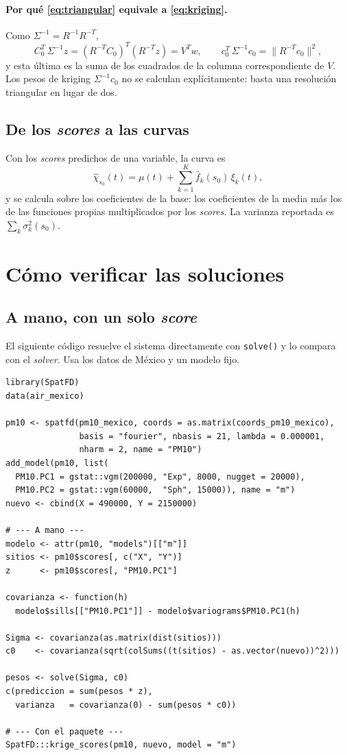 \documentclass[11pt,a4paper]{article}
\newcommand{\code}[1]{\texttt{#1}}
\begin{document}
\paragraph{Por qué \eqref{eq:triangular} equivale a \eqref{eq:kriging}.}
Como $\Sigma^{-1} = R^{-1} R^{-T}$,
\[
  C_0^{T}\,\Sigma^{-1} z = (R^{-T} C_0)^{T} (R^{-T} z) = V^{T} w,
  \qquad
  c_{0}^{T}\,\Sigma^{-1} c_{0} = \lVert R^{-T} c_{0} \rVert^2 ,
\]
y esta última es la suma de los cuadrados de la columna correspondiente de
$V$. Los pesos de kriging $\Sigma^{-1} c_0$ no se calculan explícitamente:
basta una resolución triangular en lugar de dos.

\subsection{De los \emph{scores} a las curvas}

Con los \emph{scores} predichos de una variable, la curva es
\[
  \hat\chi_{s_0}(t) = \mu(t) + \sum_{k=1}^{K} \hat f_k(s_0)\,\xi_k(t),
\]
y se calcula sobre los coeficientes de la base: los coeficientes de la media
más los de las funciones propias multiplicados por los \emph{scores}. La
varianza reportada es $\sum_k \sigma_k^2(s_0)$.

\section{Cómo verificar las soluciones}

\subsection{A mano, con un solo \emph{score}}

El siguiente código resuelve el sistema directamente con \code{solve()} y lo
compara con el \emph{solver}. Usa los datos de México y un modelo fijo.

{\small
\begin{verbatim}
library(SpatFD)
data(air_mexico)

pm10 <- spatfd(pm10_mexico, coords = as.matrix(coords_pm10_mexico),
               basis = "fourier", nbasis = 21, lambda = 0.000001,
               nharm = 2, name = "PM10")
add_model(pm10, list(
  PM10.PC1 = gstat::vgm(200000, "Exp", 8000, nugget = 20000),
  PM10.PC2 = gstat::vgm(60000,  "Sph", 15000)), name = "m")
nuevo <- cbind(X = 490000, Y = 2150000)

# --- A mano ---
modelo <- attr(pm10, "models")[["m"]]
sitios <- pm10$scores[, c("X", "Y")]
z      <- pm10$scores[, "PM10.PC1"]

covarianza <- function(h)
  modelo$sills[["PM10.PC1"]] - modelo$variograms$PM10.PC1(h)

Sigma <- covarianza(as.matrix(dist(sitios)))
c0    <- covarianza(sqrt(colSums((t(sitios) - as.vector(nuevo))^2)))

pesos <- solve(Sigma, c0)
c(prediccion = sum(pesos * z),
  varianza   = covarianza(0) - sum(pesos * c0))

# --- Con el paquete ---
SpatFD:::krige_scores(pm10, nuevo, model = "m")
\end{verbatim}
}
\end{document}
